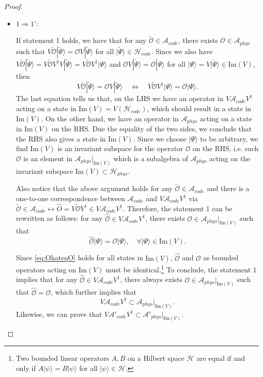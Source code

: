 \documentclass[a4paper,11pt]{article}
\newcommand{\ket}[1]{| #1 \rangle } %
\renewcommand{\=}[1]{\stackrel{#1}{=}} %
\newcommand{\im}{\text{Im}}
\def\A{\mathcal{A}}
\def\O{\mathcal{O}}
\def\H{\mathcal{H}}
\begin{document}
\begin{proof}
	
	
	\begin{itemize}
		\item $1\Rightarrow 1'$:
		
		If statement 1 holds, we have that for any $\widetilde{\O}\in\A_{code}$, there exists $\O\in \A_{phys}$ such that
		$V\widetilde{\O}\ket{\widetilde{\Psi}}=\O V\ket{\widetilde{\Psi}}$ for all $ \ket{\widetilde{\Psi}}\in\H_{code}$. Since we also have $V\widetilde{\O}\ket{\widetilde{\Psi}}=V\widetilde{\O}V^\dagger V\ket{\widetilde{\Psi}}=V\widetilde{\O}V^\dagger \ket{\Psi}$ and $\O V\ket{\widetilde{\Psi}}=\O\ket{\Psi}$ for all $\ket{\Psi}=V\ket{\widetilde{\Psi}}\in\im(V)$, then
		\begin{equation}
			V\widetilde{\O}\ket{\widetilde{\Psi}}=\O V\ket{\widetilde{\Psi}}\quad \Leftrightarrow \quad V\widetilde{\O}V^\dagger \ket{\Psi}=\O\ket{\Psi}.
		\end{equation}
		The last equation tells us that, on the LHS we have an operator in $V\A_{code} V^\dagger$ acting on a state in $\im(V)=V(\H_{code})$, which should result in a state in $\im(V)$. On the other hand, we have an operator in $\A_{phys}$ acting on a state in $\im(V)$ on the RHS. Due the equality of the two sides, we conclude that the RHS also gives a state in $\im(V)$. Since we choose $\ket{\Psi}$ to be arbitrary, we find $\im(V)$ is an invariant subspace for the operator $\O$ on the RHS, i.e. such $\O$ is an element in $\A_{phys}|_{\im(V)}$ which is a subalgebra of $\A_{phys}$ acting on the invariant subspace $\im(V)\subset \H_{phys}$.
		
		Also notice that the above argument holds for any $\widetilde{\O}\in \A_{code}$ and there is a one-to-one correspondence between $\A_{code}$ and $V\A_{code} V^\dagger$ via $\widetilde{\O}\in\A_{code}\leftrightarrow \widehat{O}=V\widetilde{\O}V^\dagger\in V\A_{code} V^\dagger$.
		Therefore, the statement 1 can be rewritten as follows: for any $\widehat{\O}\in V\A_{code} V^\dagger$, there exists $\O\in \A_{phys}|_{\im(V)}$ such that 
		\begin{equation}\label{eq:OhateqO}
			\widehat{\O}\ket{\Psi}=\O\ket{\Psi},\quad \forall \ket{\Psi}\in \im(V).
		\end{equation}
		
		
		
		
		
		
		
		Since \eqref{eq:OhateqO} holds for all states in $\im(V)$, $\widehat{\O}$ and $\O$ as bounded operators acting on $\im(V)$ must be identical.\footnote{Two bounded linear operators $A,B$ on a Hilbert space $\H$ are equal if and only if $A\ket{\psi}=B\ket{\psi}$ for all $\ket{\psi}\in\H$.} To conclude, the statement 1 implies that for any $\widehat{\O}\in V\A_{code} V^\dagger$, there always exists $\O\in \A_{phys}|_{\im(V)}$ such that $\widehat{\O}=\O$, which further implies that
		\begin{equation}
			V\A_{code} V^\dagger \subset \A_{phys}|_{\im(V)}.
		\end{equation}
		Likewise, we can prove that $V\A'_{code} V^\dagger \subset \A'_{phys}|_{\im(V)}$. 
		

\end{itemize}
\end{proof}
\end{document}
